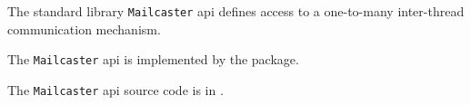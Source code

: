 
The standard library {\tt Mailcaster} api defines access to a one-to-many inter-thread communication mechanism.

The {\tt Mailcaster} api is implemented by the  package.

The {\tt Mailcaster} api source code is in .





